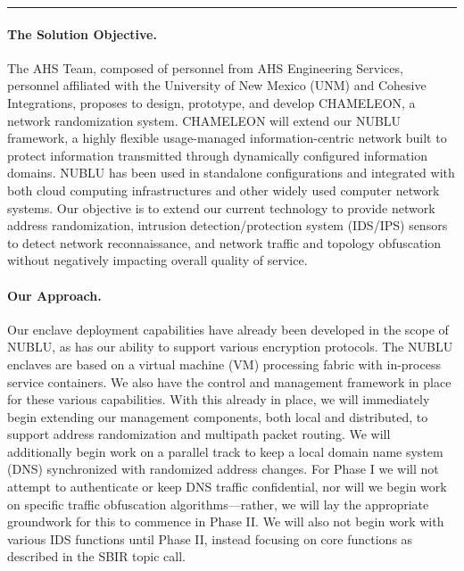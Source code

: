\documentclass{sbir}
\begin{document}
\vspace*{0.1in}
\hrule

\clearpage
{}

\paragraph{The Solution Objective.} The AHS Team, composed of personnel from AHS Engineering Services, personnel affiliated with the University of New Mexico (UNM) and Cohesive Integrations, proposes to design, prototype, and develop CHAMELEON, a network randomization system. CHAMELEON will extend our NUBLU framework, a highly flexible usage-managed information-centric network built to protect information transmitted through dynamically configured information domains. NUBLU has been used in standalone configurations and integrated with both cloud computing infrastructures and other widely used computer network systems. Our objective is to extend our current technology to provide network address randomization, intrusion detection/protection system (IDS/IPS) sensors to detect network reconnaissance, and network traffic and topology obfuscation without negatively impacting overall quality of service.

\paragraph{Our Approach.} Our enclave deployment capabilities have already been developed in the scope of NUBLU, as has our ability to support various encryption protocols. The NUBLU enclaves are based on a virtual machine (VM) processing fabric with in-process service containers. We also have the control and management framework in place for these various capabilities. With this already in place, we will immediately begin extending our management components, both local and distributed, to support address randomization and multipath packet routing. We will additionally begin work on a parallel track to keep a local domain name system (DNS) synchronized with randomized address changes. For Phase I we will not attempt to authenticate or keep DNS traffic confidential, nor will we begin work on specific traffic obfuscation algorithms---rather, we will lay the appropriate groundwork for this to commence in Phase II. We will also not begin work with various IDS functions until Phase II, instead focusing on core functions as described in the SBIR topic call.
\end{document}
